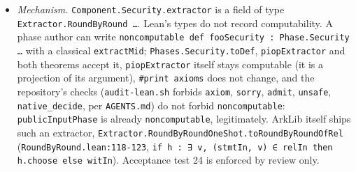 \begin{itemize}
\item \emph{Mechanism.} \texttt{Component.\allowbreak{}Security.\allowbreak{}extractor} is a field of type \texttt{Extractor.\allowbreak{}RoundByRound …}. Lean's types do not record computability. A phase author can write \texttt{n\allowbreak{}o\allowbreak{}n\allowbreak{}c\allowbreak{}o\allowbreak{}m\allowbreak{}p\allowbreak{}u\allowbreak{}t\allowbreak{}a\allowbreak{}b\allowbreak{}l\allowbreak{}e\allowbreak{} d\allowbreak{}e\allowbreak{}f\allowbreak{} f\allowbreak{}o\allowbreak{}o\allowbreak{}S\allowbreak{}e\allowbreak{}c\allowbreak{}u\allowbreak{}r\allowbreak{}i\allowbreak{}t\allowbreak{}y\allowbreak{} :\allowbreak{} P\allowbreak{}h\allowbreak{}a\allowbreak{}s\allowbreak{}e\allowbreak{}.\allowbreak{}S\allowbreak{}e\allowbreak{}c\allowbreak{}u\allowbreak{}r\allowbreak{}i\allowbreak{}t\allowbreak{}y\allowbreak{} …} with a classical \texttt{extractMid}; \texttt{Phases.\allowbreak{}Security.\allowbreak{}toDef}, \texttt{piopExtractor} and both theorems accept it, \texttt{piopExtractor} itself stays computable (it is a projection of its argument), \texttt{\#print axioms} does not change, and the repository's checks (\texttt{audit-{}lean.\allowbreak{}sh} forbids \texttt{axiom}, \texttt{sorry}, \texttt{admit}, \texttt{unsafe}, \texttt{native\_\allowbreak{}decide}, per \texttt{AGENTS.\allowbreak{}md}) do not forbid \texttt{noncomputable}: \texttt{publicInputPhase} is already \texttt{noncomputable}, legitimately. ArkLib itself ships such an extractor, \texttt{E\allowbreak{}x\allowbreak{}t\allowbreak{}r\allowbreak{}a\allowbreak{}c\allowbreak{}t\allowbreak{}o\allowbreak{}r\allowbreak{}.\allowbreak{}R\allowbreak{}o\allowbreak{}u\allowbreak{}n\allowbreak{}d\allowbreak{}B\allowbreak{}y\allowbreak{}R\allowbreak{}o\allowbreak{}u\allowbreak{}n\allowbreak{}d\allowbreak{}O\allowbreak{}n\allowbreak{}e\allowbreak{}S\allowbreak{}h\allowbreak{}o\allowbreak{}t\allowbreak{}.\allowbreak{}t\allowbreak{}o\allowbreak{}R\allowbreak{}o\allowbreak{}u\allowbreak{}n\allowbreak{}d\allowbreak{}B\allowbreak{}y\allowbreak{}R\allowbreak{}o\allowbreak{}u\allowbreak{}n\allowbreak{}d\allowbreak{}O\allowbreak{}f\allowbreak{}R\allowbreak{}e\allowbreak{}l} (\texttt{RoundByRound.\allowbreak{}lean:118-{}123}, \texttt{i\allowbreak{}f\allowbreak{} h\allowbreak{} :\allowbreak{} ∃\allowbreak{} v\allowbreak{},\allowbreak{} (\allowbreak{}s\allowbreak{}t\allowbreak{}m\allowbreak{}t\allowbreak{}I\allowbreak{}n\allowbreak{},\allowbreak{} v\allowbreak{})\allowbreak{} ∈\allowbreak{} r\allowbreak{}e\allowbreak{}l\allowbreak{}I\allowbreak{}n\allowbreak{} t\allowbreak{}h\allowbreak{}e\allowbreak{}n\allowbreak{} h\allowbreak{}.\allowbreak{}c\allowbreak{}h\allowbreak{}o\allowbreak{}o\allowbreak{}s\allowbreak{}e\allowbreak{} e\allowbreak{}l\allowbreak{}s\allowbreak{}e\allowbreak{} w\allowbreak{}i\allowbreak{}t\allowbreak{}I\allowbreak{}n}). Acceptance test 24 is enforced by review only.

\end{itemize}
